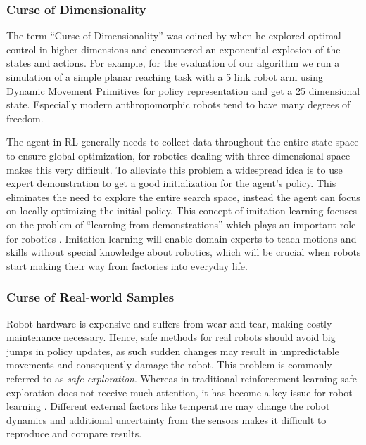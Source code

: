 \subsubsection{Curse of Dimensionality}
The term ``Curse of Dimensionality'' was coined by \citet{Bellman:1957} when
he explored optimal control in higher dimensions and encountered
an exponential explosion of the states and actions.
For example, for the evaluation of our algorithm we run a simulation of a
simple planar reaching task
with a 5 link robot arm using Dynamic Movement Primitives \citep{ijspeert2002learning}
for policy representation and get a 25 dimensional state.
Especially modern anthropomorphic robots tend to have many degrees of
freedom.

The agent in RL generally needs to collect data throughout the entire
state-space to ensure global optimization, for robotics dealing with
three dimensional space makes this very difficult.
To alleviate this problem  a widespread idea is to use expert demonstration
to get a good initialization for the agent's policy. This
eliminates the need to explore the entire search space, instead the
agent can focus on locally optimizing the initial policy.
This concept of imitation learning focuses on the problem of ``learning
from demonstrations'' which plays an important role
for robotics \citep{Osaetal18}. Imitation learning
will enable domain experts to teach motions and
skills without special knowledge about robotics, which will be crucial
when robots start making their way from factories into everyday life.

\subsubsection{Curse of Real-world Samples}
Robot hardware is expensive and suffers from wear and tear, making
costly maintenance necessary. Hence, safe methods for real robots
should avoid big jumps in policy updates, as such sudden changes may
result in unpredictable movements and consequently damage the robot.
This problem is commonly referred to as \textit{safe exploration}.
Whereas in traditional reinforcement learning
safe exploration does not receive much attention,
it has become a key issue for robot learning \citep{schneider1997exploiting}.
Different external factors like temperature may change the robot dynamics and
additional uncertainty from the sensors makes it difficult to reproduce and
compare results.

